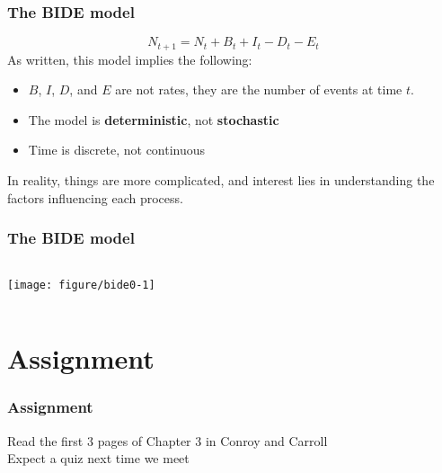 \documentclass[color=usenames,dvipsnames]{beamer}\usepackage[]{graphicx}\usepackage[]{color}
\begin{document}
\begin{frame}
  \frametitle{The BIDE model}
  \huge
  \[
  N_{t+1} = N_t + B_t + I_t - D_t - E_t
  \]
  \large
  \vfill
  {%
    As written, this model implies the following:}
  \begin{itemize}%
    \item<1-> $B$, $I$, $D$, and $E$ are not rates, they
      are the number of events at time $t$.
    \item The model is {\bf deterministic}, not {\bf stochastic}
    \item Time is discrete, not continuous
  \end{itemize}
  \pause
  \vfill
  In reality, things are more complicated, and interest lies in
  understanding the factors influencing each process.\par
  \pause
  \vfill
\end{frame}


\begin{frame}
  \frametitle{The BIDE model}
  \begin{columns}
    \column{\dimexpr\paperwidth-10pt}
    \centering
    \texttt{[image: figure/bide0-1]} \\
  \end{columns}
\end{frame}


\section{Assignment}


\begin{frame}
  \frametitle{Assignment}
  \Large
  Read the first 3 pages of Chapter 3 in Conroy and Carroll \\
  \vfill
  Expect a quiz next time we meet
\end{frame}
\end{document}
